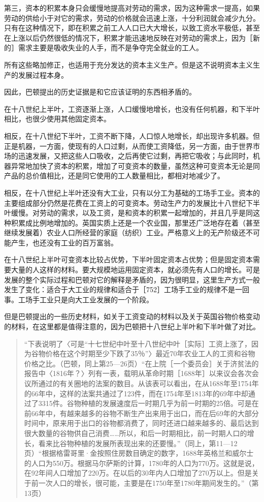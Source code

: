 第三，资本的积累本身只会缓慢地提高对劳动的需求，因为这种需求一提高，如果劳动的供给小于对它的需求，劳动的价格就会迅速上涨，十分利润就会减少九分。只有在这种情况下，即在积累之前工人人口已大大增长，以致工资水平极低，甚至在上涨以后仍然很低的情况下，积累才能迅速地反映在对劳动的需求上，因为［新的］需求主要是吸收失业的人手，而不是争夺完全就业的工人。

所有这些略加修正，也适用于充分发达的资本主义生产。但是这不说明资本主义生产的发展过程本身。

因此，巴顿提出的历史证据是和它应该证明的东西相矛盾的。

在十八世纪上半叶，工资逐渐上涨，人口缓慢地增长，也没有任何机器，和下半叶相比，也很少使用其他固定资本。

相反，在十八世纪下半叶，工资不断下降，人口惊人地增长，却出现许多机器。但正是机器，一方面，使现有的人口过剩，从而使工资降低，另一方面，由于世界市场的迅速发展，又把这些人口吸收，之后再使它过剩，再把它吸收；与此同时，机器异常地加快了资本的积累，增加了可变资本的数量，虽然这种可变资本无论是同产品的总价值相比，还是同它使用的工人数量相比，都相对地减少了。

相反，在十八世纪上半叶还没有大工业，只有以分工为基础的工场手工业。资本的主要组成部分仍然是花费在工资上的可变资本。劳动生产力的发展比十八世纪下半叶缓慢。对劳动的需求，以及工资，是和资本的积累一起增加的，并且几乎是同这种积累成比例地增加的。英国实质上还是一个农业国，那里还广泛地存在着（甚至继续发展着）农业人口所经营的家庭（纺织）工业。严格意义上的无产阶级还不可能产生，也还没有工业的百万富翁。

在十八世纪上半叶可变资本比较占优势，下半叶固定资本占优势；但是固定资本需要大量的人这样的材料。要大规模地运用固定资本，就必须先有人口的增长。可是发展的整个实际过程和巴顿对它的解释是矛盾的，因为很明显，这里生产方式一般发生了变化：适合于大工业的规律和适合于［752］工场手工业的规律不是一回事。工场手工业只是向大工业发展的一个阶段。

但是巴顿提出的一些历史材料，如关于工资变动的材料以及关于英国谷物价格变动的材料，在这里都是值得注意的，因为巴顿把十八世纪上半叶和下半叶做了对比。

\begin{quote}{“下表说明了〈可是“十七世纪中叶至十八世纪中叶［实际］工资上涨了，因为谷物价格在这个时期至少下跌了35％”〉最近70年农业工人的工资和谷物价格之比。（巴顿，同上第25—26页）“在上院［一个委员会］关于济贫法的报告中〈1816年？〉列有一表，载明从革命时期［1688年］以来议会各次会议所通过的有关圈地的法案的数目。从该表可以看出，在从1688年至1754年的66年中，这样的法案共通过了123件，而在1754年至1813年的69年中却通过了3315件。谷物种植的发展速度后一时期几乎为前一时期的25倍。可是在前66年中，有越来越多的谷物不断生产出来用于出口，而在后69年的大部分时间中，原来用于出口的谷物都消费了，同时还进口越来越多的、最后达到很大数量的谷物供自己消费……所以，和后一时期相比，前一时期人口的增长，看来比谷物种植的发展所表现出来的还要慢。”（同上，第11—12页）“根据格雷哥里·金按照住房数目确定的数字，1688年英格兰和威尔士的人口为550万。根据马尔萨斯的计算，1780年的人口为770万。这就是说，在92年间人口增加了220万。在以后的30年内人口增加了270万以上。但是关于前一次人口的增长，很可能，主要是在1750年至1780年期间发生的。”（第13页）}\end{quote}

